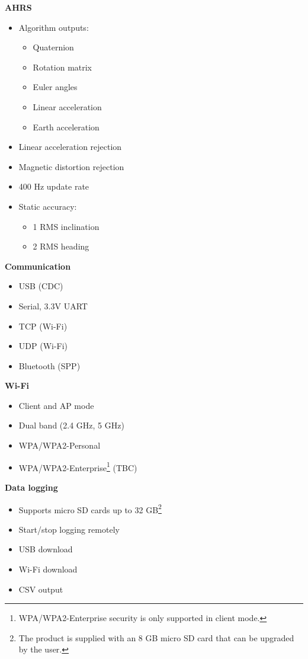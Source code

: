\begin{multicols}{2}
\textbf{\acs{AHRS}}
\begin{itemize}[nolistsep]
    \item Algorithm outputs:
    \begin{itemize}
        \item Quaternion
        \item Rotation matrix
        \item Euler angles
        \item Linear acceleration
        \item Earth acceleration
    \end{itemize}
    \item Linear acceleration rejection
    \item Magnetic distortion rejection
    \item 400 Hz update rate
    \item Static accuracy:
        \begin{itemize}
            \item 1\textdegree{} \acs{RMS} inclination
            \item 2\textdegree{} \acs{RMS} heading
        \end{itemize}
\end{itemize}

\columnbreak

\textbf{Communication}
\begin{itemize}[nolistsep]
    \item \acs{USB} (\acs{CDC})
    \item Serial, 3.3V \acs{UART}
    \item \acs{TCP} (Wi-Fi)
    \item \acs{UDP} (Wi-Fi)
    \item Bluetooth (\acs{SPP})
\end{itemize}

\textbf{Wi-Fi}
\begin{itemize}[nolistsep]
    \item Client and \acs{AP} mode
    \item Dual band (2.4 GHz, 5 GHz)
    \item WPA/WPA2-Personal
    \item WPA/WPA2-Enterprise\footnote{WPA/WPA2-Enterprise security is only supported in client mode.} (TBC)
\end{itemize}

\textbf{Data logging}
\begin{itemize}[nolistsep]
    \item Supports micro \acs{SD} cards up to 32 GB\footnote{The product is supplied with an 8 GB micro \acs{SD} card that can be upgraded by the user.}
    \item Start/stop logging remotely
    \item USB download
    \item Wi-Fi download
    \item \acs{CSV} output
\end{itemize}


\end{multicols}

